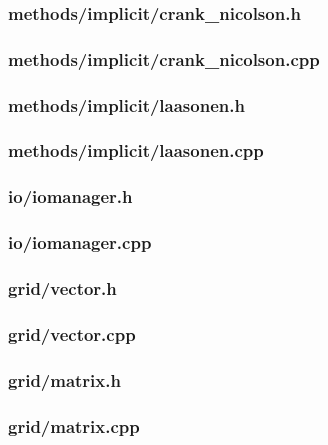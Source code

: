 \documentclass[12pt]{article}
\begin{document}
\subsubsection*{methods/implicit/crank\_nicolson.h}


\subsubsection*{methods/implicit/crank\_nicolson.cpp}


\subsubsection*{methods/implicit/laasonen.h}


\subsubsection*{methods/implicit/laasonen.cpp}


\subsubsection*{io/iomanager.h}


\subsubsection*{io/iomanager.cpp}


\subsubsection*{grid/vector.h}


\subsubsection*{grid/vector.cpp}


\subsubsection*{grid/matrix.h}


\subsubsection*{grid/matrix.cpp}




\end{document}
